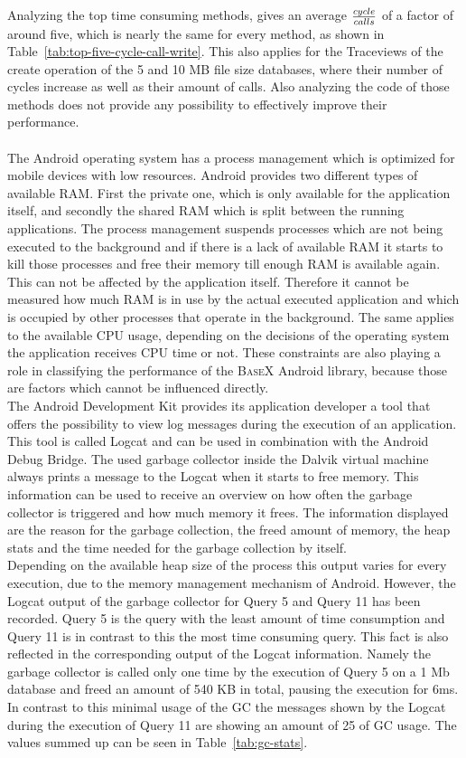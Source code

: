 Analyzing the top time consuming methods, gives an average ${cycle \over calls}$ of a factor of around five, which is nearly the same for every method, as shown in Table~\ref{tab:top-five-cycle-call-write}.
This also applies for the Traceviews of the create operation of the 5 and 10 MB file size databases, where their number of cycles increase as well as their amount of calls.
Also analyzing the code of those methods does not provide any possibility to effectively improve their performance.\\
\\
The Android operating system has a process management which is optimized for mobile devices with low resources.
Android provides two different types of available RAM. 
First the private one, which is only available for the application itself, and secondly the shared RAM which is split between the running applications.
The process management suspends processes which are not being executed to the background and if there is a lack of available RAM it starts to kill those processes and free their memory till enough RAM is available again.
This can not be affected by the application itself.
Therefore it cannot be measured how much RAM is in use by the actual executed application and which is occupied by other processes that operate in the background.
The same applies to the available CPU usage, depending on the decisions of the operating system the application receives CPU time or not.
These constraints are also playing a role in classifying the performance of the \textsc{BaseX} Android library, because those are factors which cannot be influenced directly.\\
The Android Development Kit provides its application developer a tool that offers the possibility to view log messages during the execution of an application.
This tool is called Logcat and can be used in combination with the Android Debug Bridge.
The used garbage collector inside the Dalvik virtual machine always prints a message to the Logcat when it starts to free memory.
This information can be used to receive an overview on how often the garbage collector is triggered and how much memory it frees.
The information displayed are the reason for the garbage collection, the freed amount of memory, the heap stats and the time needed for the garbage collection by itself.\\
Depending on the available heap size of the process this output varies for every execution, due to the memory management mechanism of Android.
However, the Logcat output of the garbage collector for Query 5 and Query 11 has been recorded.
Query 5 is the query with the least amount of time consumption and Query 11 is in contrast to this the most time consuming query.
This fact is also reflected in the corresponding output of the Logcat information.
Namely the garbage collector is called only one time by the execution of Query 5 on a 1 Mb database and freed an amount of 540 KB in total, pausing the execution for 6ms.
In contrast to this minimal usage of the GC the messages shown by the Logcat during the execution of Query 11 are showing an amount of 25 of GC usage.
The values summed up can be seen in Table~\ref{tab:gc-stats}.

